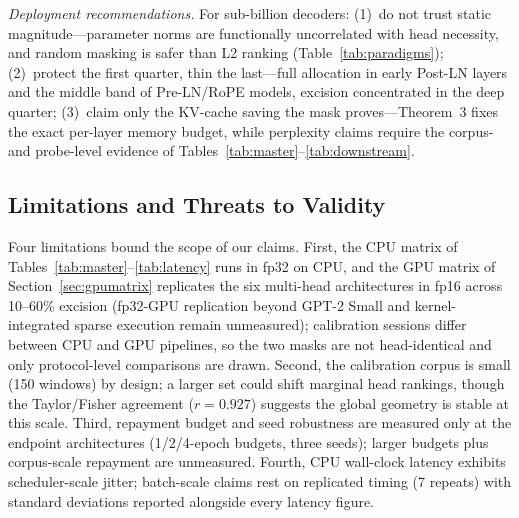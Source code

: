 \documentclass[11pt]{article}
\begin{document}
\emph{Deployment recommendations.} For sub-billion decoders: (1)~do not trust
static magnitude---parameter norms are functionally uncorrelated with head necessity,
and random masking is safer than L2 ranking (Table~\ref{tab:paradigms});
(2)~protect the first quarter, thin the last---full allocation in early Post-LN
layers and the middle band of Pre-LN/RoPE models, excision concentrated in the
deep quarter; (3)~claim only the KV-cache saving the mask proves---Theorem~3
fixes the exact per-layer memory budget, while perplexity claims require the
corpus- and probe-level evidence of Tables~\ref{tab:master}--\ref{tab:downstream}.

\subsection{Limitations and Threats to Validity}
Four limitations bound the scope of our claims. First, the CPU matrix of
Tables~\ref{tab:master}--\ref{tab:latency} runs in fp32 on CPU, and the GPU
matrix of Section~\ref{sec:gpumatrix} replicates the six multi-head
architectures in fp16 across 10--60\% excision (fp32-GPU replication beyond
GPT-2 Small and kernel-integrated sparse execution remain unmeasured);
calibration sessions differ between CPU and GPU pipelines, so the
two masks are not head-identical and only protocol-level comparisons are
drawn. Second, the calibration corpus is small (150 windows) by design; a larger set
could shift marginal head rankings, though the Taylor/Fisher agreement
($r=0.927$) suggests the global geometry is stable at this scale. Third, repayment budget
and seed robustness are measured only at the endpoint architectures (1/2/4-epoch
budgets, three seeds); larger budgets plus corpus-scale repayment are unmeasured.
Fourth, CPU wall-clock latency exhibits
scheduler-scale jitter; batch-scale claims rest on replicated timing (7
repeats) with standard deviations reported alongside every latency figure.
\end{document}
